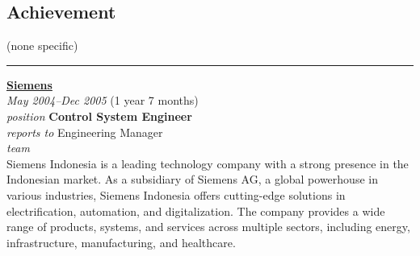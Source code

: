 \documentclass[12pt]{res}
\begin{document}
\begin{resume}
\begin{minipage}[t]{0.42\linewidth}
	\section{Achievement}
	\begin{flushleft}
        \footnotesize{\vspace{2.6pt}
(none specific)}
	\end{flushleft}
\end{minipage}

\vspace{10pt}
\rule{1.0\textwidth}{0.1pt}

\begin{multicols}{2}
	{\large {\bf \href{https://siemens.co.id}{Siemens}}} \\
	{\footnotesize{\sl May 2004--Dec 2005} \hfill (1 year 7 months)}\\
	{\footnotesize{\sl position} \hfill \bf{Control System Engineer}}\\
	{\footnotesize{\sl reports to} \hfill Engineering Manager}\\
	{\footnotesize{\sl team} \hfill }\\

	\columnbreak
	{\footnotesize{Siemens Indonesia is a leading technology company with a strong presence in the Indonesian market. As a subsidiary of Siemens AG, a global powerhouse in various industries, Siemens Indonesia offers cutting-edge solutions in electrification, automation, and digitalization. The company provides a wide range of products, systems, and services across multiple sectors, including energy, infrastructure, manufacturing, and healthcare.}}\\
\end{multicols}
\vspace{-20pt}

\begin{multicols}{2}

\end{multicols}
\end{resume}
\end{document}
